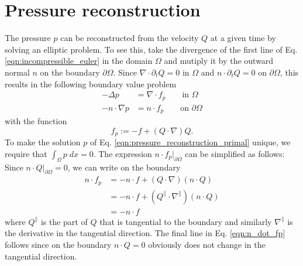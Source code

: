\documentclass[11pt]{article}
\begin{document}
\section{Pressure reconstruction}
The pressure $p$ can be reconstructed from the velocity $Q$ at a given time by solving an elliptic problem. To see this, take the divergence of the first line of Eq. \eqref{eqn:incompressible_euler} in the domain $\Omega$ and mutiply it by the outward normal $n$ on the boundary $\partial \Omega$. Since $\nabla\cdot \partial_t Q = 0$ in $\Omega$ and $n\cdot \partial_t Q=0$ on $\partial \Omega$, this results in the following boundary value problem
\begin{equation}
    \begin{aligned}
        -\Delta p        & = \nabla \cdot f_p\qquad\text{in $\Omega$}    \\
        -n\cdot \nabla p & = n\cdot f_p \qquad\text{on $\partial\Omega$}
    \end{aligned}\label{eqn:pressure_reconstruction_primal}
\end{equation}
with the function
\begin{equation}
    f_p := -f + (Q\cdot \nabla) Q.
\end{equation}
To make the solution $p$ of Eq. \eqref{eqn:pressure_reconstruction_primal} unique, we require that $\int_\Omega p\;dx=0$. The expression $n\cdot f_p\vert_{\partial \Omega}$ can be simplified as follows: Since $n\cdot Q\vert_{\partial \Omega}=0$, we can write on the boundary
\begin{equation}
    \begin{aligned}
        n\cdot f_p & = -n\cdot f + (Q\cdot \nabla) (n\cdot Q)                   \\
                   & = -n\cdot f+(Q^\parallel \cdot \nabla^\parallel)(n\cdot Q) \\
                   & = -n\cdot f
    \end{aligned}\label{eqn:n_dot_fp}
\end{equation}
where $Q^\parallel$ is the part of $Q$ that is tangential to the boundary and similarly $\nabla^\parallel$ is the derivative in the tangential direction. The final line in Eq. \eqref{eqn:n_dot_fp} follows since on the boundary $n\cdot Q=0$ obviously does not change in the tangential direction.
\end{document}
